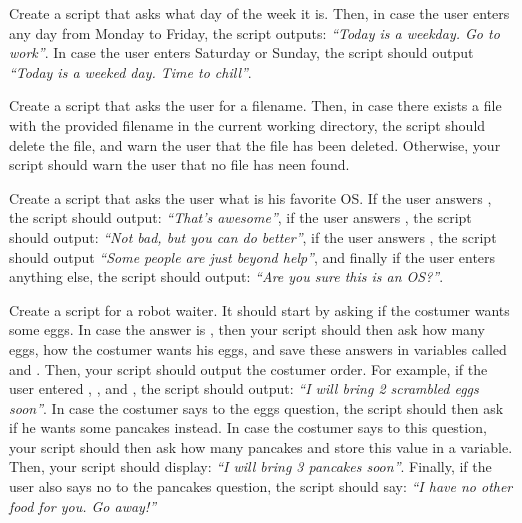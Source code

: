 \begin{exercises}
  \item Create a script that asks what day of the week it is. Then, in case the user enters any day from Monday to Friday, the script outputs: \textit{``Today is a weekday. Go to work''}. In case the user enters Saturday or Sunday, the script should output \textit{``Today is a weeked day. Time to chill''}.
\item Create a script that asks the user for a filename. Then, in case there exists a file with the provided filename in the current working directory, the script should delete the file, and warn the user that the file has been deleted. Otherwise, your script should warn the user that no file has neen found.
\item Create a script that asks the user what is his favorite OS. If the user answers , the script should output: \textit{``That's awesome''}, if the user answers , the script should output: \textit{``Not bad, but you can do better''}, if the user answers , the script should output \textit{``Some people are just beyond help''}, and finally if the user enters anything else, the script should output: \textit{``Are you sure this is an OS?''}.
\item Create a script for a robot waiter. It should start by asking if the costumer wants some eggs. In case the answer is , then your script should then ask how many eggs, how the costumer wants his eggs, and save these answers in variables called  and . Then, your script should output the costumer order. For example, if the user entered , , and , the script should output: \textit{``I will bring 2 scrambled eggs soon''}.
In case the costumer says  to the eggs question, the script should then ask if he wants some pancakes instead. In case the costumer says  to this question, your script should then ask how many pancakes and store this value in a  variable. Then, your script should display: \textit{``I will bring 3 pancakes soon''}. Finally, if the user also says no to the pancakes question, the script should say: \textit{``I have no other food for you. Go away!''}
\end{exercises}
